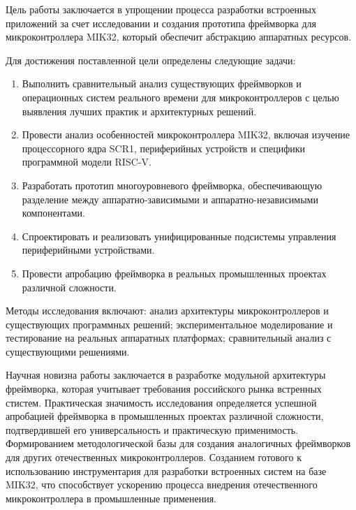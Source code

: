 Цель работы заключается в упрощении процесса разработки встроенных приложений за счет исследовании и создания прототипа фреймворка для микроконтроллера MIK32, который обеспечит абстракцию аппаратных ресурсов.

Для достижения поставленной цели определены следующие задачи:

\begin{enumerate}
	\item Выполнить сравнительный анализ существующих фреймворков и операционных систем реального времени для микроконтроллеров с целью выявления лучших практик и архитектурных решений.
	\item Провести анализ особенностей микроконтроллера MIK32, включая изучение процессорного ядра SCR1, периферийных устройств и специфики программной модели RISC-V.
	\item Разработать прототип многоуровневого фреймворка, обеспечивающую разделение между аппаратно-зависимыми и аппаратно-независимыми компонентами.
	\item Спроектировать и реализовать унифицированные подсистемы управления периферийными устройствами.
	\item Провести апробацию фреймворка в реальных промышленных проектах различной сложности.
\end{enumerate}

Методы исследования включают: анализ архитектуры микроконтроллеров и существующих программных решений; экспериментальное моделирование и тестирование на реальных аппаратных платформах; сравнительный анализ с существующими решениями.

Научная новизна работы заключается в разработке модульной архитектуры фреймворка, которая учитывает требования российского рынка встренных стистем.
Практическая значимость исследования определяется успешной апробацией фреймворка в промышленных проектах различной сложности, подтвердившей его универсальность и практическую применимость. Формированием методологической базы для создания аналогичных фреймворков для других отечественных микроконтроллеров. Созданием готового к использованию инструментария для разработки встроенных систем на базе MIK32, что способствует ускорению процесса внедрения отечественного микроконтроллера в промышленные применения.

